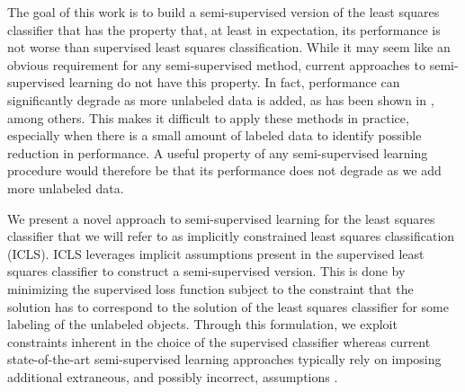 \documentclass{llncs}
\begin{document}
The goal of this work is to build a semi-supervised version of the least squares classifier that has the property that, at least in expectation, its performance is not worse than supervised least squares classification.
While it may seem like an obvious requirement for any semi-supervised method, current approaches to semi-supervised learning do not have this property. 
In fact, performance can significantly degrade as more unlabeled data is added, as has been shown in \cite{Cozman2006,Cozman2003}, among others.
This makes it difficult to apply these methods in practice, especially when there is a small amount of labeled data to identify possible reduction in performance.
A useful property of any semi-supervised learning procedure would therefore be that its performance does not degrade as we add more unlabeled data.

We present a novel approach to semi-supervised learning for the least squares classifier that we will refer to as implicitly constrained least squares classification (ICLS). 
ICLS leverages implicit assumptions present in the supervised least squares classifier to construct a semi-supervised version. This is done by minimizing the supervised loss function subject to the constraint that the solution has to correspond to the solution of the least squares classifier for some labeling of the unlabeled objects.
Through this formulation, we exploit constraints inherent in the choice of the supervised classifier whereas current state-of-the-art semi-supervised learning approaches typically rely on imposing additional extraneous, and possibly incorrect, assumptions \cite{Seeger2001,Singh2008}.
\end{document}
